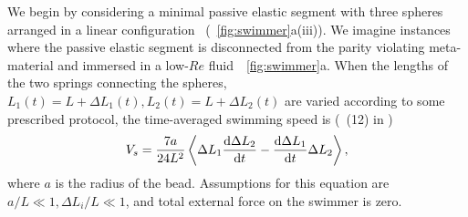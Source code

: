 \documentclass[
 preprint,
 preprintnumbers,
 amsmath,amssymb,
 aps,
 pre,
 longbibliography,
 superscriptaddress,
 10pt, twocolumn
]{revtex4-1}
\begin{document}
 We begin by considering a minimal passive elastic segment with three spheres arranged in a linear configuration~\cite{Golestanian2008AnalyticResults} (\figurename~\ref{fig:swimmer}a(iii)). We imagine instances where the passive elastic segment is disconnected from the parity violating meta-material and immersed in a low-$Re$ fluid~\figurename~\ref{fig:swimmer}a. When the lengths of the two springs connecting the spheres, $L_1(t) = L+\Delta L_1(t), L_2(t) = L+\Delta L_2(t)$ are varied according to some prescribed protocol, the time-averaged swimming speed is (\eqnname~(12) in \cite{Golestanian2008AnalyticResults})
\begin{equation} \label{eqn:swimmer_speed}
    V_s = \frac{7a}{24L^2} \expval{\Delta L_1 \dv{\Delta L_2}{t} - \dv{\Delta L_1}{t} \Delta{L_2}},
\end{equation}
where $a$ is the radius of the bead. Assumptions for this equation are $a/L \ll 1, \Delta L_i/L \ll 1$, and total external force on the swimmer is zero.

\end{document}
